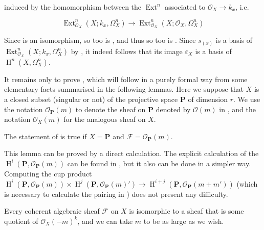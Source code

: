 induced by the homomorphism between the $\operatorname{Ext}^n$ associated to $\mathcal{O}_X\to k_x$, i.e.

\begin{equation}\tag{5.5}\label{fga1-equation-5.5}
  \operatorname{Ext}_{\mathcal{O}_X}^n(X;k_x,\Omega_X^n) \to \operatorname{Ext}_{\mathcal{O}_X}^n(X;\mathcal{O}_X,\Omega_X^n)
\end{equation}

Since  is an isomorphism, so too is , and thus so too is .
Since $s_{(x)}$ is a basis of $\operatorname{Ext}_{\mathcal{O}_X}^n(X;k_x,\Omega_X^n)$ by , it indeed follows that its image $\varepsilon_X$ is a basis of $\operatorname{H}^n(X,\Omega_X^n)$.

It remains only to prove , which will follow in a purely formal way from some elementary facts summarised in the following lemmas.
Here we suppose that $X$ is a closed subset (singular or not) of the projective space $\mathbf{P}$ of dimension $r$.
We use the notation $\mathcal{O}_\mathbf{P}(m)$ to denote the sheaf on $\mathbf{P}$ denoted by $\mathcal{O}(m)$ in \cite{Ser1955}, and the notation $\mathcal{O}_X(m)$ for the analogous sheaf on $X$.


\begin{lemma}\label{fga1-lemma-2}
  The statement of  is true if $X=\mathbf{P}$ and $\mathcal{F}=\mathcal{O}_\mathbf{P}(m)$.
\end{lemma}

\begin{cproof}
  This lemma can be proved by a direct calculation.
  The explicit calculation of the $\operatorname{H}^i(\mathbf{P},\mathcal{O}_\mathbf{P}(m))$ can be found in \cite{Ser1955}, but it also can be done in a simpler way.
  Computing the cup product $\operatorname{H}^i(\mathbf{P},\mathcal{O}_\mathbf{P}(m))\times\operatorname{H}^j(\mathbf{P},\mathcal{O}_\mathbf{P}(m)') \to \operatorname{H}^{i+j}(\mathbf{P},\mathcal{O}_\mathbf{P}(m+m'))$ (which is necessary to calculate the pairing in ) does not present any difficulty.
\end{cproof}


\begin{lemma}\label{fga1-lemma-3}
  Every coherent algebraic sheaf $\mathcal{F}$ on $X$ is isomorphic to a sheaf that is some quotient of $\mathcal{O}_X(-m)^k$, and we can take $m$ to be as large as we wish.
\end{lemma}


